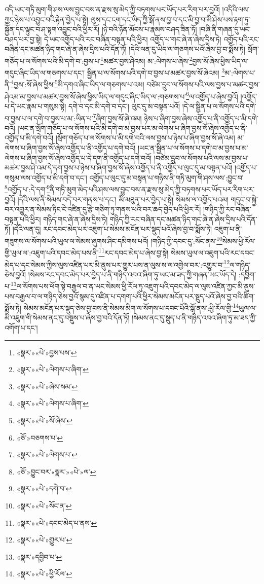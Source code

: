 འདི་ཡང་གཏི་མུག་གི་ཤས་ལས་བྱུང་བས་ན་རྫས་སུ་མེད་ཀྱི་བཏགས་པར་ཡོད་པར་རིག་པར་བྱའོ། །འདིའི་ལས་ཀྱང་ཉེས་པ་འབྱུང་བའི་རྟེན་བྱེད་པ་སྟེ། ལུས་དང་ངག་དང་ཡིད་ཀྱི་སྒོ་ནས་བྱ་བ་དང་མི་བྱ་བ་མི་ཤེས་པས་རྟག་ཏུ་སྐྱོན་དང་ལྟུང་བ་ཤ་སྟག་འབྱུང་བའི་ཕྱིར་རོ། །ཉེ་བའི་ཉོན་མོངས་པ་རྣམས་བཤད་ཟིན་ཏོ། །བཞི་ནི་གཞན་དུ་ཡང་བཤད་པར་བྱ་སྟེ། དེ་ཡང་འགྱོད་པའི་རང་བཞིན་བསྟན་པའི་ཕྱིར། འགྱོད་པ་གང་ཞེ་ན་ཞེས་དྲིས་ཏེ། འགྱོད་པའི་རང་བཞིན་དང་མཚན་ཉིད་གང་ཞེ་ན་ཞེས་དྲིས་པའི་དོན་ཏོ། །དེའི་ལན་དུ་ཡིད་ལ་གཅགས་པའོ་ཞེས་བྱ་བ་སྨོས་ཏེ། སྲོག་གཅོད་པ་ལ་སོགས་པའི་མི་དགེ་བ་:བྱས་པ་\footnote{«སྣར་»«པེ་»བྱས་པས་}མཚར་བྱས་ཤེའམ། མ་:ལེགས་པ་ཞེས་\footnote{«སྣར་»«པེ་»ལེགས་པ་ཞིག་}བྱས་སོ་ཞེས་ཕྱིས་ཡིད་ལ་གདུང་ཞིང་ཡིད་ལ་གཅགས་པ་དང་། སྦྱིན་པ་ལ་སོགས་པའི་དགེ་བ་བྱས་པ་མཚར་བྱས་སོ་ཞེའམ། \footnote{«སྣར་»«པེ་»ཞེས་སམ་}མ་:ལེགས་པ་ནི་\footnote{«སྣར་»«པེ་»ལེགས་པ་ཞིག་}བྱས་:སོ་ཞེས་ཕྱིས་\footnote{«སྣར་»«པེ་»སོ་ཞེས་}མི་དགའ་ཞིང་ཡིད་ལ་གཅགས་པ་འམ། བཙེམ་དྲུབ་ལ་སོགས་པའི་ལས་བྱས་པ་མཚར་བྱས་ཤེའམ་མ་བྱས་པ་མཚར་བྱས་སོ་ཞེས་ཕྱིས་ཡིད་ལ་གདུང་ཞིང་ཡིད་ལ་:གཅགས་པ་\footnote{«ཅོ་»བཅགས་པ་}ལ་འགྱོད་པ་ཞེས་བྱའོ། །འགྱོད་པ་དེ་ཡང་རྣམ་པ་གསུམ་སྟེ། དགེ་བ་དང་མི་དགེ་བ་དང་། ལུང་དུ་མ་བསྟན་པའོ། །དེ་ལ་སྦྱིན་པ་ལ་སོགས་པའི་དགེ་བ་བྱས་པ་ལ་དགེ་བ་བྱས་པ་མ་:ཡིན་པ་\footnote{«སྣར་»«པེ་»ལེགས་པ་}ཞིག་བྱས་སོ་ཞེ་འམ། ཉེས་པ་ཞིག་བྱས་ཞེས་འགྱོད་པ་ནི་འགྱོད་པ་མི་དགེ་བའོ། །ཡང་ན་སྲོག་གཅོད་པ་ལ་སོགས་པའི་མི་དགེ་བ་མ་བྱས་པར་མ་ལེགས་པ་ཞིག་བྱས་སོ་ཞེས་འགྱོད་པ་ནི་འགྱོད་པ་མི་དགེ་བའོ། །སྲོག་གཅོད་པ་ལ་སོགས་པ་མི་དགེ་བའི་ལས་བྱས་པ་ཉེས་པ་ཞིག་བྱས་སོ་ཞེ་འམ། མ་ལེགས་པ་ཞིག་བྱས་སོ་ཞེས་འགྱོད་པ་ནི་འགྱོད་པ་དགེ་བའོ། །ཡང་ན་སྦྱིན་པ་ལ་སོགས་པ་དགེ་བ་མ་བྱས་པ་མ་ལེགས་པ་ཞིག་བྱས་སོ་ཞེས་འགྱོད་པ་དེ་དག་ནི་འགྱོད་པ་དགེ་བའོ། །བཙེམ་དྲུབ་ལ་སོགས་པའི་ལས་མ་བྱས་པ་མཚར་བྱས་ཤེ་འམ་དེ་དག་བྱས་པ་ཉེས་པ་ཞིག་བྱས་སོ་ཞེས་འགྱོད་པ་ནི་འགྱོད་པ་ལུང་དུ་མ་བསྟན་པའོ། །འགྱོད་པ་གསུམ་ལས་འགྱོད་པ་མི་དགེ་བ་དང་། འགྱོད་པ་ལུང་དུ་མ་བསྟན་པ་གཉིས་ནི་གཏི་མུག་གི་ཤས་ལས་:བྱུང་བ་\footnote{«ཅོ་»བྱུང་བར་«སྣར་»«པེ་»ལ་}འགྱོད་པ་:དེ་དག་\footnote{«སྣར་»«པེ་»དགེ་བ་}ནི་གཏི་མུག་མེད་པའི་ཤས་ལས་བྱུང་བས་ན་རྫས་སུ་མེད་ཀྱི་བཏགས་པར་ཡོད་པར་རིག་པར་བྱའོ། །དེའི་ལས་ནི་སེམས་བདེ་བར་གནས་པ་དང་། མི་མཐུན་པར་བྱེད་པ་སྟེ། སེམས་ལ་འགྱོད་པའམ། གདུང་བ་སྐྱེ་བར་འགྱུར་ན་སེམས་ཏིང་ངེ་འཛིན་དུ་རྩེ་གཅིག་ཏུ་གནས་པའི་བར་ཆད་བྱེད་པའི་ཕྱིར་རོ། །གཉིད་ཀྱི་རང་བཞིན་བསྟན་པའི་ཕྱིར། གཉིད་གང་ཞེ་ན་ཞེས་དྲིས་ཏེ། གཉིད་ཀྱི་རང་བཞིན་དང་མཚན་ཉིད་གང་ཞེ་ན་ཞེས་དྲིས་པའི་དོན་ཏོ། །དེའི་ལན་དུ། རང་དབང་མེད་པར་འཇུག་པ་སེམས་མངོན་པར་སྡུད་པའོ་ཞེས་བྱ་བ་སྨོས་ཏེ། འཇུག་པ་ནི་གཟུགས་ལ་སོགས་པའི་ཡུལ་ལ་སེམས་ཞུགས་ཤིང་དམིགས་པའོ། །གཉིད་ཀྱི་དབང་དུ་:སོང་ནས་\footnote{«སྣར་»«པེ་»སོང་ན་}སེམས་ཕྱི་རོལ་གྱི་ཡུལ་ལ་:འཇུག་པའི་དབང་མེད་པས་ནི་\footnote{«སྣར་»«པེ་»དབང་མེད་པ་ནས་}རང་དབང་མེད་པ་ཞེས་བྱ་སྟེ། སེམས་ཡུལ་ལ་འཇུག་པའི་རང་དབང་མེད་པ་དང་སེམས་ཀྱིས་ལུས་འཛིན་པར་མི་ནུས་པར་གྱུར་པས་ན་ལུས་ས་ལ་འགྱེལ་བར་:འགྱུར་བ་\footnote{«སྣར་»«པེ་»གྱུར་པ་}ལ་གཉིད་ཅེས་བྱའོ། །སེམས་རང་དབང་མེད་པར་བྱེད་པ་ནི་གཉིད་འབའ་ཞིག་ཏུ་ཡང་མ་ཟད་ཀྱི་གཞན་ཡང་ཡོད་དེ། :དབྱིག་པ་\footnote{«སྣར་»དབྱིབ་པ་}ལ་སོགས་པས་ཕོག་སྟེ་བརྒྱལ་བ་ན་ཡང་སེམས་ཕྱི་རོལ་ཏུ་འཇུག་པའི་དབང་མེད་ལ་ལུས་འཛིན་ཀྱང་མི་ནུས་པས་བརྒྱལ་བ་ལ་གཉིད་ཅེས་བྱའོ་སྙམ་དུ་འཛིན་པ་དགག་པའི་ཕྱིར་སེམས་མངོན་པར་སྡུད་པའོ་ཞེས་བྱ་བའི་ཚིག་སྨོས་ཏེ། སེམས་མངོན་པར་སྡུད་ཅེས་བྱ་བས་ནི་སེམས་མིག་ལ་སོགས་པ་དབང་པོའི་སྒོ་ནས་:ཕྱི་རོལ་གྱི་\footnote{«སྣར་»«པེ་»ཕྱི་རོལ་}ཡུལ་ལ་མི་འཇུག་གི་སེམས་ནང་དུ་བསྡུས་པ་ཞེས་བྱ་བའི་དོན་ཏོ། །སེམས་ནང་དུ་སྡུད་པ་ནི་གཉིད་འབའ་ཞིག་ཏུ་མ་ཟད་ཀྱི་འགོག་པ་དང་། 